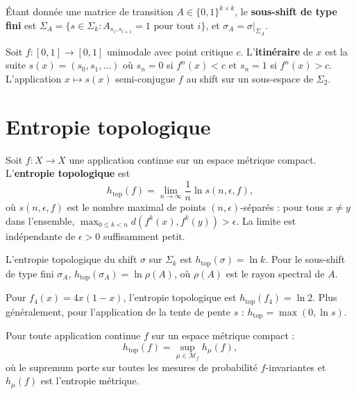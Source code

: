 \begin{definition}
\'Etant donn\'ee une matrice de transition $A \in \{0,1\}^{k \times k}$, le
\textbf{sous-shift de type fini} est
$\Sigma_A = \{s \in \Sigma_k : A_{s_i, s_{i+1}} = 1 \text{ pour tout } i\}$,
et $\sigma_A = \sigma|_{\Sigma_A}$.
\end{definition}

\begin{proposition}
Soit $f : [0,1] \to [0,1]$ unimodale avec point critique $c$. L'\textbf{itin\'eraire}
de $x$ est la suite $s(x) = (s_0, s_1, \ldots)$ o\`u $s_n = 0$ si $f^n(x) < c$
et $s_n = 1$ si $f^n(x) > c$. L'application $x \mapsto s(x)$ semi-conjugue
$f$ au shift sur un sous-espace de $\Sigma_2$.
\end{proposition}

\section{Entropie topologique}

\begin{definition}
Soit $f : X \to X$ une application continue sur un espace m\'etrique compact.
L'\textbf{entropie topologique} est
\[
    h_{\mathrm{top}}(f) = \lim_{n \to \infty} \frac{1}{n} \ln s(n, \epsilon, f),
\]
o\`u $s(n, \epsilon, f)$ est le nombre maximal de points
$(n, \epsilon)$-s\'epar\'es : pour tous $x \neq y$ dans l'ensemble,
$\max_{0 \leq k < n} d(f^k(x), f^k(y)) > \epsilon$.
La limite est ind\'ependante de $\epsilon > 0$ suffisamment petit.
\end{definition}

\begin{theoreme}
L'entropie topologique du shift $\sigma$ sur $\Sigma_k$ est
$h_{\mathrm{top}}(\sigma) = \ln k$.
Pour le sous-shift de type fini $\sigma_A$, $h_{\mathrm{top}}(\sigma_A) = \ln \rho(A)$,
o\`u $\rho(A)$ est le rayon spectral de $A$.
\end{theoreme}

\begin{proposition}
Pour $f_4(x) = 4x(1-x)$, l'entropie topologique est $h_{\mathrm{top}}(f_4) = \ln 2$.
Plus g\'en\'eralement, pour l'application de la tente de pente $s$ :
$h_{\mathrm{top}} = \max(0, \ln s)$.
\end{proposition}

\begin{theoreme}
Pour toute application continue $f$ sur un espace m\'etrique compact :
\[
    h_{\mathrm{top}}(f) = \sup_{\mu \in \mathcal{M}_f} h_\mu(f),
\]
o\`u le supremum porte sur toutes les mesures de probabilit\'e $f$-invariantes
et $h_\mu(f)$ est l'entropie m\'etrique.
\end{theoreme}

